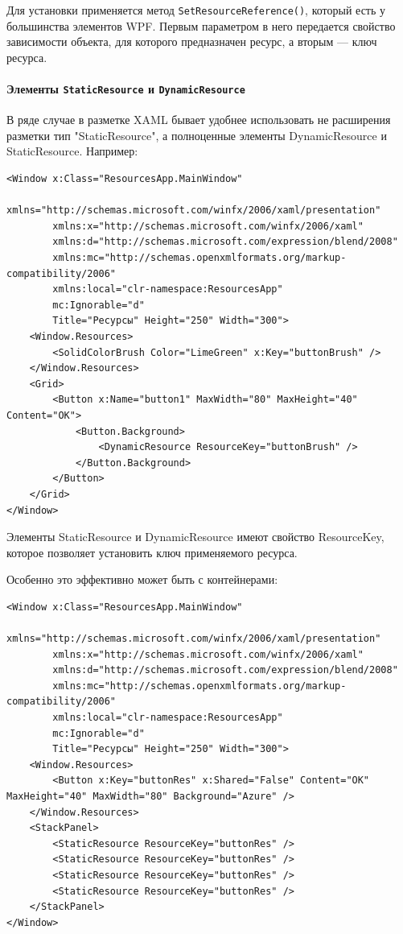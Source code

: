 Для установки применяется метод \texttt{SetResourceReference()}, который есть у большинства элементов WPF. Первым параметром в него передается свойство зависимости объекта, для которого предназначен ресурс, а вторым — ключ ресурса.

\paragraph{Элементы \texttt{StaticResource} и  \texttt{DynamicResource}}

В ряде случае в разметке XAML бывает удобнее использовать не расширения разметки тип "{StaticResource}", а полноценные элементы DynamicResource и StaticResource. Например:

\begin{verbatim}
<Window x:Class="ResourcesApp.MainWindow"
        xmlns="http://schemas.microsoft.com/winfx/2006/xaml/presentation"
        xmlns:x="http://schemas.microsoft.com/winfx/2006/xaml"
        xmlns:d="http://schemas.microsoft.com/expression/blend/2008"
        xmlns:mc="http://schemas.openxmlformats.org/markup-compatibility/2006"
        xmlns:local="clr-namespace:ResourcesApp"
        mc:Ignorable="d"
        Title="Ресурсы" Height="250" Width="300">
    <Window.Resources>
        <SolidColorBrush Color="LimeGreen" x:Key="buttonBrush" />
    </Window.Resources>
    <Grid>
        <Button x:Name="button1" MaxWidth="80" MaxHeight="40" Content="OK">
            <Button.Background>
                <DynamicResource ResourceKey="buttonBrush" />
            </Button.Background>
        </Button>
    </Grid>
</Window>
\end{verbatim}

Элементы StaticResource и DynamicResource имеют свойство ResourceKey, которое позволяет установить ключ применяемого ресурса.

Особенно это эффективно может быть с контейнерами:

\begin{verbatim}
<Window x:Class="ResourcesApp.MainWindow"
        xmlns="http://schemas.microsoft.com/winfx/2006/xaml/presentation"
        xmlns:x="http://schemas.microsoft.com/winfx/2006/xaml"
        xmlns:d="http://schemas.microsoft.com/expression/blend/2008"
        xmlns:mc="http://schemas.openxmlformats.org/markup-compatibility/2006"
        xmlns:local="clr-namespace:ResourcesApp"
        mc:Ignorable="d"
        Title="Ресурсы" Height="250" Width="300">
    <Window.Resources>
        <Button x:Key="buttonRes" x:Shared="False" Content="OK" MaxHeight="40" MaxWidth="80" Background="Azure" />
    </Window.Resources>
    <StackPanel>
        <StaticResource ResourceKey="buttonRes" />
        <StaticResource ResourceKey="buttonRes" />
        <StaticResource ResourceKey="buttonRes" />
        <StaticResource ResourceKey="buttonRes" />
    </StackPanel>
</Window>
\end{verbatim}

